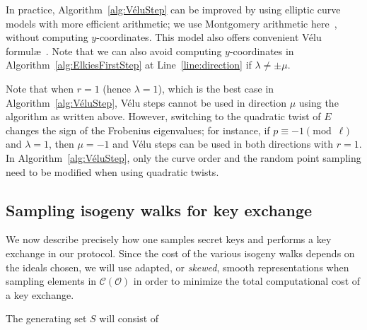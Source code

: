 \documentclass{llncs}
\newcommand{\Cl}{\mathcal{C}}
\renewcommand{\O}{\mathcal{O}}
\begin{document}
In practice, Algorithm~\ref{alg:VéluStep} can be improved
by using elliptic curve models with more efficient arithmetic;
we use Montgomery arithmetic here~\cite{Montgomery87,CostelloSmith2017},
without computing $y$-coordinates. This model also
offers convenient Vélu formul\ae~\cite{Renes2018}.
Note that we can also avoid computing $y$-coordinates in
Algorithm~\ref{alg:ElkiesFirstStep}
at Line~\ref{line:direction} if $\lambda\neq\pm\mu$.

\begin{remark}
    \label{rem:twist-trick}
    Note that when $r = 1$ (hence $\lambda = 1$), which is the best case
    in Algorithm~\ref{alg:VéluStep}, Vélu steps cannot be used in direction $\mu$
    using the algorithm as written above. However, switching to the quadratic
    twist of $E$ changes the sign of the Frobenius eigenvalues; 
    for instance, if $p \equiv -1\pmod{\ell}$ and $\lambda = 1$, then $\mu=-1$ and
    Vélu steps can be used in both directions with $r=1$.
    In Algorithm~\ref{alg:VéluStep}, only the curve order
    and the random point sampling need to be modified when using quadratic twists.
\end{remark}

\subsection{Sampling isogeny walks for key exchange}

We now describe precisely how one samples secret keys and performs a key
exchange in our protocol. 
Since the cost of the various isogeny walks depends on the ideals
chosen,
we will use adapted, or \emph{skewed}, 
smooth representations when sampling elements in $\Cl(\O)$
in order to minimize the total computational cost of a key exchange.

The generating set $S$ will consist of
\end{document}
